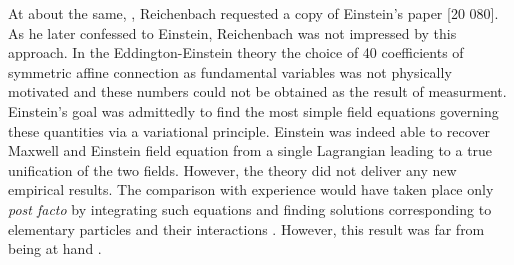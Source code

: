 \documentclass[draft]{article}
\begin{document}
At about the same, , Reichenbach requested a copy of Einstein's paper  \citep{Einstein1923c} [20 080]. As he later confessed to Einstein, Reichenbach was not impressed by this approach. In the Eddington-Einstein theory the choice of 40 coefficients of symmetric affine connection \Gtmn as fundamental variables was not physically motivated and these numbers could not be obtained as the result of measurment. Einstein's goal was admittedly to find the most simple field equations  governing these quantities via a variational principle. Einstein was indeed able to recover Maxwell and Einstein field equation from a single Lagrangian leading to a true unification of the two fields. However, the theory did not deliver any new empirical results. The comparison with experience would have taken place only \emph{post facto} by integrating such equations and finding solutions corresponding to elementary particles and their interactions . However, this result was far from being at hand \citep[140]{Einstein1923e}. 
\end{document}
